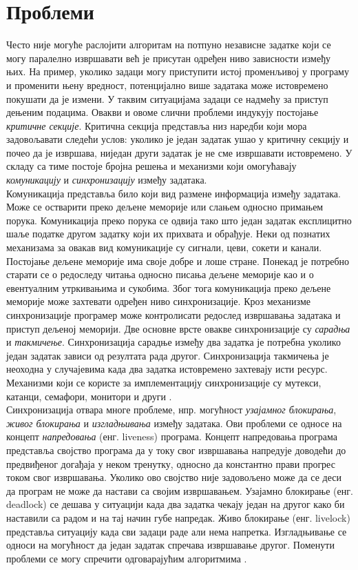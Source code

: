 \documentclass[12pt,oneside]{memoir}
\begin{document}
  \section{Проблеми}
  Често није могуће раслојити алгоритам на потпуно независне задатке који се могу паралелно извршавати већ је присутан одређен ниво зависности између њих. На пример, уколико задаци могу приступити истој променљивој у програму и променити њену вредност, потенцијално више задатака може истовремено покушати да је измени. У таквим ситуацијама задаци се надмећу за приступ дењеним подацима.  Овакви и овоме слични проблеми индукују постојање \emph{критичне секције}. Критична секција представља низ наредби који мора задовољавати следећи услов: уколико је један задатак ушао у критичну секцију и почео да је извршава, ниједан други задатак је не сме извршавати истовремено. У складу са тиме постоје бројна решења и механизми који омогућавају \emph{комуникацију} и  \emph{синхронизацију} између задатака.
\\ 
 \indent  
Комуникација представља било који вид размене информација између задатака. Може се остварити преко дељене меморије или слањем односно примањем порука. Комуникација преко порука се одвија тако што један задатак експлицитно шаље податке другом задатку који их прихвата и обрађује. Неки од познатих механизама за овакав вид комуникације су сигнали, цеви, сокети и канали.
Постојање дељене меморије има своје добре и лоше стране. Понекад је потребно старати се о редоследу читања односно писања дељене меморије као и о евентуалним утркивањима и сукобима. Због тога комуникација преко дељене меморије може захтевати одређен ниво синхронизације. Кроз механизме синхронизације програмер може контролисати редослед извршавања задатака и приступ дељеној меморији. Две основне врсте овакве синхронизације су \emph{сарадња} и \emph{такмичење}. Синхронизација сарадње између два задатка је потребна уколико један задатак зависи од резултата рада другог. Синхронизација такмичења је неоходна у случајевима када два задатка истовремено захтевају исти ресурс. Механизми који се користе за имплементацију синхронизације су мутекси, катанци, семафори, монитори и други \cite{lang_prag}.
\\ \indent Синхронизација отвара многе проблеме, нпр. могућност \emph{узајамног блокирања}, \emph{живог блокирања} и \emph{изгладњивања} између задатака. Ови проблеми се односе на концепт \emph{напредовања} (енг. liveness) програма. Концепт напредовања програма представља својство програма да у току свог извршавања напредује доводећи до предвиђеног догађаја у неком тренутку, односно да константно прави прогрес током свог извршавања. Уколико ово својство није задовољено може да се деси да програм не може да настави са својим извршавањем. Узајамно блокирање (енг. deadlock) се дешава у ситуацији када два задатка чекају један на другог како би наставили са радом и на тај начин губе напредак. Живо блокирање (енг. livelock) представља ситуацију када сви задаци раде али нема напретка. Изгладњивање се односи на могућност да један задатак спречава извршавање другог. Поменути проблеми се могу спречити одговарајућим алгоритмима \cite{opsis}.
\end{document}
